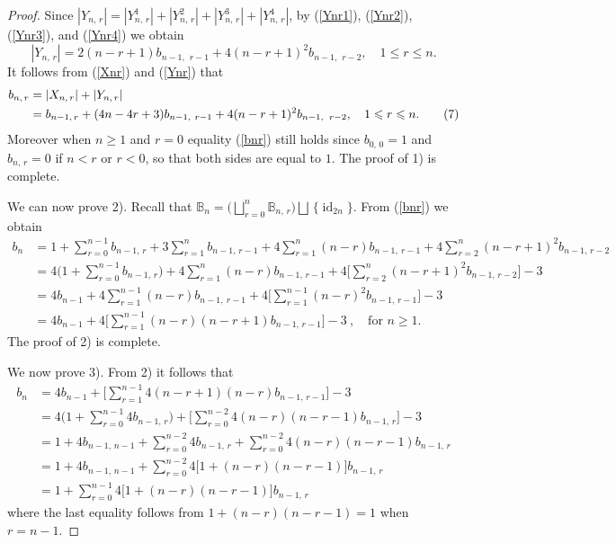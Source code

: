 \documentclass[11pt]{article}
\newcommand{\q}{\quad}
\newcommand{\ges}{\geqslant}
\newcommand{\les}{\leqslant}
\DeclareMathOperator{\id}{id}
\begin{document}
\begin{proof}
Since $|Y_{n,\,r}| = |Y_{n,\,r}^1|+|Y_{n,\,r}^2|+|Y_{n,\,r}^3|+|Y_{n,\,r}^4|$, by (\ref{Ynr1}), (\ref{Ynr2}), (\ref{Ynr3}), and (\ref{Ynr4}) we obtain
\[\label{Ynr}
    |Y_{n,\,r}| = 2(n-r+1)b_{n-1,\, ~r-1} + 4(n-r+1)^2 b_{n-1,\, ~r-2},\q 1\les r\les n.\tag{6}
\]
It follows from (\ref{Xnr}) and (\ref{Ynr}) that
\begin{align*}{\label{bnr}}
  b_{n,\, r} &= |X_{n,\,r}| + |Y_{n,\,r}|\\
            &= b_{n-1, \,r} + (4n-4r+3) b_{n-1, ~r-1} + 4(n-r+1)^2 b_{n-1,\, ~r-2},\q 1\les r\les n.\tag{7}
\end{align*}
Moreover when $n\ges 1$ and $r=0$ equality (\ref{bnr}) still holds since $b_{0,\,0}=1$ and $b_{n,\, r} = 0$ if $n<r$ or $r<0$,  so that both sides are equal to $1$. The proof of 1) is complete.

We can now prove 2). Recall that
$
   \mathbb{B}_n = \big(\bigsqcup_{r=0}^n \mathbb{B}_{n,\, r}\big)\bigsqcup\,\{\id_{2n}\}.
$ 
From (\ref{bnr}) we  obtain
\begin{align*}
    b_n &=1+ \sum_{r=0}^{n-1} b_{n-1, \,r} + 3\sum_{r=1}^{n}b_{n-1,\,r-1} +4\sum_{r=1}^{n}(n-r) b_{n-1, ~r-1} + 4\sum_{r=2}^{n}(n-r+1)^2 b_{n-1, \,r-2}  \\
        &=4\Big(1+\sum_{r=0}^{n-1}b_{n-1,\,r}\Big) +4\sum_{r=1}^{n}(n-r) b_{n-1, \,r-1} + 4\Big[\sum_{r=2}^{n}(n-r+1)^2 b_{n-1, \,r-2}\Big]-3\\
        &= 4b_{n-1} + 4\sum_{r=1}^{n-1} (n-r)b_{n-1, ~r-1} + 4\Big[\sum_{r=1}^{n-1} (n-r)^2 b_{n-1, \,r-1}\Big]-3 \\
        &= 4b_{n-1} + 4\Big[\sum_{r=1}^{n-1} (n-r)(n-r+1)b_{n-1, \,r-1}\Big] - 3~,\quad\mbox{for } n\ges 1.
\end{align*}
The proof of 2) is complete.

We now prove 3). From 2) it follows that
\begin{align*}
b_n&=4b_{n-1}+\Big[\sum_{r=1}^{n-1}4(n-r+1)(n-r)b_{n-1,\,r-1}\Big]-3 \\
&=4\Big(1+\sum_{r=0}^{n-1}4b_{n-1,\,r}\Big) +\Big[\sum_{r=0}^{n-2}4(n-r)(n-r-1)b_{n-1,\,r}\Big]-3\\
&=1+4b_{n-1,\,n-1}+\sum_{r=0}^{n-2}4b_{n-1,\,r}+\sum_{r=0}^{n-2}4(n-r)(n-r-1)b_{n-1,\,r}\\
&=1+4b_{n-1,\,n-1}+\sum_{r=0}^{n-2}4\big[1+(n-r)(n-r-1)  \big]     b_{n-1,\,r}\\
&=1+\sum_{r=0}^{n-1}4\big[1+(n-r)(n-r-1)  \big]    b_{n-1,\,r}
\end{align*}
where the last equality follows from $1+(n-r)(n-r-1)  =1$ when $r=n-1$.  
\end{proof}
\end{document}
